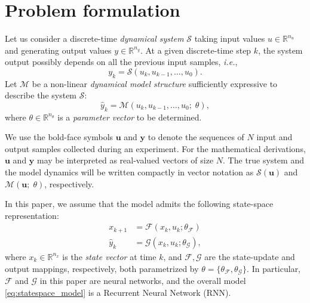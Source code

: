 \documentclass{article}
\newcommand{\nsamp}{{N}}
\newcommand{\npar}{{n_\theta}}
\newcommand{\nx}{{n_x}}
\newcommand{\ny}{{n_y}}
\newcommand{\nin}{{n_u}}
\newcommand{\M}{\mathcal{M}}
\newcommand{\F}{\mathcal{F}}
\newcommand{\G}{\mathcal{G}}
\newcommand{\R}{{\mathbb{R}}}
\newcommand{\sys}{{\mathcal{S}}}
\newcommand{\tvec}[1]{{\mathbf{#1}}}
\begin{document}
\section{Problem formulation} 
\label{sec:problem_formulation}

Let us consider a discrete-time \emph{dynamical system} $\sys$ taking input values $u \in \R^\nin$ and generating output values $y \in \R^\ny$. 
At a given discrete-time step $k$, the system output possibly depends on all the previous input samples, \emph{i.e.},
\begin{equation}
    y_{k} = \sys(u_{k}, u_{k-1}, \dots, u_{0}).
\end{equation}
Let $\M$ be a non-linear  \emph{dynamical model structure} sufficiently expressive to describe the system $\sys$:
\begin{equation}
\hat y_{k} = \M(u_{k}, u_{k-1}, \dots, u_{0}; \;\theta),
\end{equation}
where $\theta \in \R^{\npar}$ is a \emph{parameter vector} to be determined. 

We use the bold-face symbols $\tvec{u}$ and $\tvec{y}$ to denote the sequences of $\nsamp$ input and output samples collected during an experiment. 
For the mathematical derivations, $\tvec{u}$ and $\tvec{y}$ may be interpreted as real-valued vectors of size $\nsamp$.
The true system  and the model dynamics will be written compactly in vector notation as $\sys(\tvec{u})$
and $\M(\tvec{u};\; \theta)$, respectively.


In this paper, we assume that the
model admits the following state-space representation:
\begin{subequations}
\label{eq:statespace_model}
\begin{align}
    x_{k+1} &=  \F(x_k, u_k; \theta_{\F}) \label{eq:statespace_model_state} \\
    \hat y_k   &= \G(x_k, u_k; \theta_{\G}) \label{eq:statespace_model_out},
\end{align}
\end{subequations}
where $x_{k} \in \R^{\nx}$ is the \emph{state vector} at time $k$, and $\F, \G$ are the state-update and output mappings, respectively, both parametrized by $\theta=\{\theta_\F,\theta_\G\}$. In particular, $\F$ and $\G$ in this paper are neural networks, and the overall model \eqref{eq:statespace_model} is a Recurrent Neural Network (RNN). 
\end{document}
